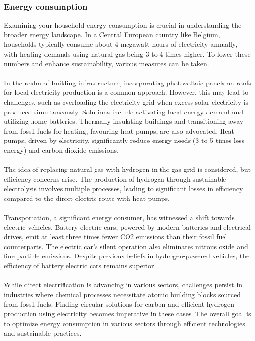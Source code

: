 \documentclass[../summary.tex]{subfiles}
\begin{document}
\subsubsection{Energy consumption}

Examining your household energy consumption is crucial in understanding the broader energy landscape. In a Central European country like Belgium, households typically consume about 4 megawatt-hours of electricity annually, with heating demands using natural gas being 3 to 4 times higher. To lower these numbers and enhance sustainability, various measures can be taken.\\
\\
In the realm of building infrastructure, incorporating photovoltaic panels on roofs for local electricity production is a common approach. However, this may lead to challenges, such as overloading the electricity grid when excess solar electricity is produced simultaneously. Solutions include activating local energy demand and utilizing home batteries. Thermally insulating buildings and transitioning away from fossil fuels for heating, favouring heat pumps, are also advocated. Heat pumps, driven by electricity, significantly reduce energy needs (3 to 5 times less energy) and carbon dioxide emissions.\\
\\
The idea of replacing natural gas with hydrogen in the gas grid is considered, but efficiency concerns arise. The production of hydrogen through sustainable electrolysis involves multiple processes, leading to significant losses in efficiency compared to the direct electric route with heat pumps.\\
\\
Transportation, a significant energy consumer, has witnessed a shift towards electric vehicles. Battery electric cars, powered by modern batteries and electrical drives, emit at least three times fewer CO2 emissions than their fossil fuel counterparts. The electric car's silent operation also eliminates nitrous oxide and fine particle emissions. Despite previous beliefs in hydrogen-powered vehicles, the efficiency of battery electric cars remains superior.\\
\\
While direct electrification is advancing in various sectors, challenges persist in industries where chemical processes necessitate atomic building blocks sourced from fossil fuels. Finding circular solutions for carbon and efficient hydrogen production using electricity becomes imperative in these cases. The overall goal is to optimize energy consumption in various sectors through efficient technologies and sustainable practices.
\end{document}
